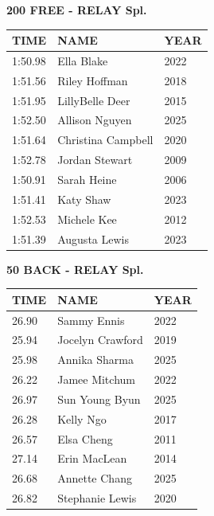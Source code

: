 \begin{table}[H]
\centering
\begin{minipage}[t]{0.6\textwidth}
\centering
\textbf{200 FREE - RELAY Spl.}\\[0.1cm]
\begin{tabular}{@{}p{1.8cm}p{2.8cm}p{1.2cm}@{}}
\hline
    \textbf{TIME} & \textbf{NAME} & \textbf{YEAR} \\
\hline
    1:50.98 & Ella Blake & 2022 \\
    1:51.56 & Riley Hoffman & 2018 \\
    1:51.95 & LillyBelle Deer & 2015 \\
    1:52.50 & Allison Nguyen & 2025 \\
    1:51.64 & Christina Campbell & 2020 \\
    1:52.78 & Jordan Stewart & 2009 \\
    1:50.91 & Sarah Heine & 2006 \\
    1:51.41 & Katy Shaw & 2023 \\
    1:52.53 & Michele Kee & 2012 \\
    1:51.39 & Augusta Lewis & 2023 \\
\hline
\end{tabular}
\end{minipage}
\end{table}

\begin{table}[H]
\centering
\begin{minipage}[t]{0.6\textwidth}
\centering
\textbf{50 BACK - RELAY Spl.}\\[0.1cm]
\begin{tabular}{@{}p{1.8cm}p{2.8cm}p{1.2cm}@{}}
\hline
    \textbf{TIME} & \textbf{NAME} & \textbf{YEAR} \\
\hline
    26.90 & Sammy Ennis & 2022 \\
    25.94 & Jocelyn Crawford & 2019 \\
    25.98 & Annika Sharma & 2025 \\
    26.22 & Jamee Mitchum & 2022 \\
    26.97 & Sun Young Byun & 2025 \\
    26.28 & Kelly Ngo & 2017 \\
    26.57 & Elsa Cheng & 2011 \\
    27.14 & Erin MacLean & 2014 \\
    26.68 & Annette Chang & 2025 \\
    26.82 & Stephanie Lewis & 2020 \\
\hline
\end{tabular}
\end{minipage}
\end{table}

